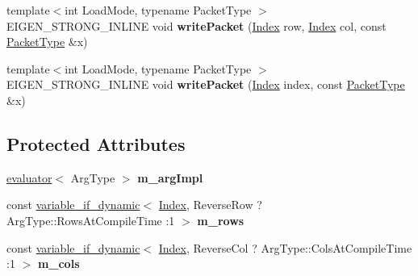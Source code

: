 \begin{DoxyCompactItemize}
{\footnotesize template$<$int Load\+Mode, typename Packet\+Type $>$ }\\E\+I\+G\+E\+N\+\_\+\+S\+T\+R\+O\+N\+G\+\_\+\+I\+N\+L\+I\+NE void {\bfseries write\+Packet} (\hyperlink{namespace_eigen_a62e77e0933482dafde8fe197d9a2cfde}{Index} row, \hyperlink{namespace_eigen_a62e77e0933482dafde8fe197d9a2cfde}{Index} col, const \hyperlink{struct_eigen_1_1_packet_type}{Packet\+Type} \&x)
\item 
\mbox{\label{struct_eigen_1_1internal_1_1unary__evaluator_3_01_reverse_3_01_arg_type_00_01_direction_01_4_01_4_a92db75ef72d0d8592961be42fd3cf186}} 
{\footnotesize template$<$int Load\+Mode, typename Packet\+Type $>$ }\\E\+I\+G\+E\+N\+\_\+\+S\+T\+R\+O\+N\+G\+\_\+\+I\+N\+L\+I\+NE void {\bfseries write\+Packet} (\hyperlink{namespace_eigen_a62e77e0933482dafde8fe197d9a2cfde}{Index} index, const \hyperlink{struct_eigen_1_1_packet_type}{Packet\+Type} \&x)
\end{DoxyCompactItemize}
\subsection*{Protected Attributes}
\begin{DoxyCompactItemize}
\item 
\mbox{\label{struct_eigen_1_1internal_1_1unary__evaluator_3_01_reverse_3_01_arg_type_00_01_direction_01_4_01_4_ae901f8a34e97b9a543bb1a9364a99313}} 
\hyperlink{struct_eigen_1_1internal_1_1evaluator}{evaluator}$<$ Arg\+Type $>$ {\bfseries m\+\_\+arg\+Impl}
\item 
\mbox{\label{struct_eigen_1_1internal_1_1unary__evaluator_3_01_reverse_3_01_arg_type_00_01_direction_01_4_01_4_a523079b27f17cdc09e9bbd5a5f16e5e7}} 
const \hyperlink{class_eigen_1_1internal_1_1variable__if__dynamic}{variable\+\_\+if\+\_\+dynamic}$<$ \hyperlink{namespace_eigen_a62e77e0933482dafde8fe197d9a2cfde}{Index}, Reverse\+Row ? Arg\+Type\+::\+Rows\+At\+Compile\+Time \+:1 $>$ {\bfseries m\+\_\+rows}
\item 
\mbox{\label{struct_eigen_1_1internal_1_1unary__evaluator_3_01_reverse_3_01_arg_type_00_01_direction_01_4_01_4_a93c0d5705ccdffe36bfd8f30b1d3fa97}} 
const \hyperlink{class_eigen_1_1internal_1_1variable__if__dynamic}{variable\+\_\+if\+\_\+dynamic}$<$ \hyperlink{namespace_eigen_a62e77e0933482dafde8fe197d9a2cfde}{Index}, Reverse\+Col ? Arg\+Type\+::\+Cols\+At\+Compile\+Time \+:1 $>$ {\bfseries m\+\_\+cols}
\end{DoxyCompactItemize}


